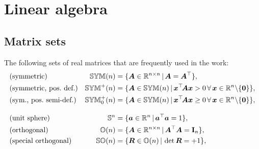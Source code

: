 \section{Linear algebra}

\subsection{Matrix sets}
The following sets of real matrices that are frequently used in the work: 
\begin{subequations}
\begin{align}
 &\text{(symmetric)}&
 \SymMat(n) &= \{ \mat{A} \in \RealNum^{n\times n} \, | \, \mat{A} = \mat{A}^\top \},
\\
 &\text{(symmetric, pos.\ def.)}&
 \SymMatP(n) &= \{ \mat{A} \in \SymMat(n) \, | \, \tuple{x}^\top\! \mat{A} \tuple{x} > 0 \, \forall \, \tuple{x} \in \RealNum^{n} \backslash \{\tuple{0}\} \},
\\
 &\text{(sym., pos.\ semi-def.)}&
 \SymMatSP(n) &= \{ \mat{A} \in \SymMat(n) \, | \, \tuple{x}^\top\! \mat{A} \tuple{x} \geq 0 \, \forall \, \tuple{x} \in \RealNum^{n} \backslash \{\tuple{0}\} \},
\\[2ex]
 &\text{(unit sphere)}&
 \mathbb{S}^n &= \{ \tuple{a} \in \RealNum^{n} \, | \, \tuple{a}^\top\tuple{a} = 1 \},
\\
 &\text{(orthogonal)}&
 \mathbb{O}(n) &= \{ \mat{A} \in \RealNum^{n\times n} \, | \, \mat{A}^\top \mat{A} = \idMat[n] \},
\\
 &\text{(special orthogonal)}&
 \SpecialOrthogonalGroup(n) &= \{ \mat{R} \in \mathbb{O}(n) \, | \, \det\mat{R} = +1 \},
\end{align} 
\end{subequations}

